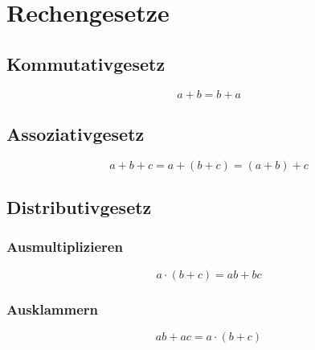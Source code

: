 \section{Rechengesetze}
\subsection{Kommutativgesetz}
\[ a + b = b + a \]

\subsection{Assoziativgesetz}
\[ a + b + c = a + (b + c) = (a + b) + c \]

\subsection{Distributivgesetz}
\subsubsection{Ausmultiplizieren}
\[ a \cdot (b + c) = ab + bc \]

\subsubsection{Ausklammern}
\[ ab + ac = a \cdot (b + c)  \]
